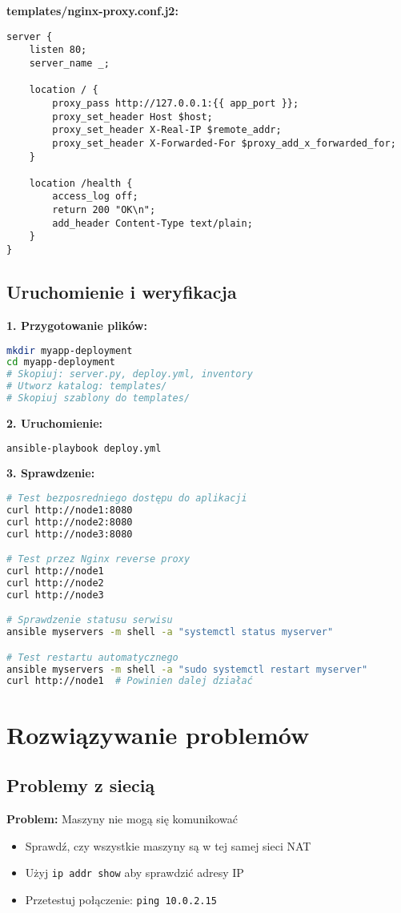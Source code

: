 \documentclass{article}
\begin{document}
\textbf{templates/nginx-proxy.conf.j2:}
\begin{lstlisting}
server {
    listen 80;
    server_name _;
    
    location / {
        proxy_pass http://127.0.0.1:{{ app_port }};
        proxy_set_header Host $host;
        proxy_set_header X-Real-IP $remote_addr;
        proxy_set_header X-Forwarded-For $proxy_add_x_forwarded_for;
    }
    
    location /health {
        access_log off;
        return 200 "OK\n";
        add_header Content-Type text/plain;
    }
}
\end{lstlisting}

\subsection*{Uruchomienie i weryfikacja}

\textbf{1. Przygotowanie plików:}
\begin{lstlisting}[language=bash]
mkdir myapp-deployment
cd myapp-deployment
# Skopiuj: server.py, deploy.yml, inventory
# Utworz katalog: templates/  
# Skopiuj szablony do templates/
\end{lstlisting}

\textbf{2. Uruchomienie:}
\begin{lstlisting}[language=bash]
ansible-playbook deploy.yml
\end{lstlisting}

\textbf{3. Sprawdzenie:}
\begin{lstlisting}[language=bash]
# Test bezposredniego dostępu do aplikacji
curl http://node1:8080
curl http://node2:8080
curl http://node3:8080

# Test przez Nginx reverse proxy
curl http://node1
curl http://node2
curl http://node3

# Sprawdzenie statusu serwisu
ansible myservers -m shell -a "systemctl status myserver"

# Test restartu automatycznego
ansible myservers -m shell -a "sudo systemctl restart myserver"
curl http://node1  # Powinien dalej działać
\end{lstlisting}



\section{Rozwiązywanie problemów}

\subsection*{Problemy z siecią}
\textbf{Problem:} Maszyny nie mogą się komunikować
\begin{itemize}
    \item Sprawdź, czy wszystkie maszyny są w tej samej sieci NAT
    \item Użyj \texttt{ip addr show} aby sprawdzić adresy IP
    \item Przetestuj połączenie: \texttt{ping 10.0.2.15}
\end{itemize}
\end{document}
